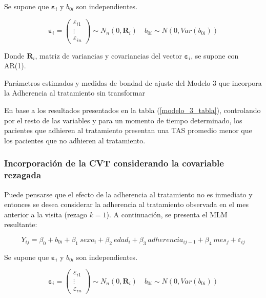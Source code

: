 \documentclass[spanish]{article}
\numberwithin{figure}{subsection}
\numberwithin{equation}{subsection}
\numberwithin{table}{subsection}
\begin{document}
Se supone que $\bm{\varepsilon}_i$ y $b_{0i}$ son independientes.

\[ 
	\bm{\varepsilon}_i = \begin{pmatrix} \varepsilon_{i1} \\ \vdots \\ \varepsilon_{in} \end{pmatrix} \sim N_{n}(0, \bm{R}_i)
	\quad
	b_{0i} \sim N(0, Var(b_{0i}))
\]

Donde $\bm{R}_i$, matriz de variancias y covariancias del vector
$\bm{\varepsilon}_{i}$, se supone con AR(1).

\begin{table}[H]
	\centering
	\caption{Parámetros estimados y medidas de bondad de ajuste del Modelo 3 que incorpora la Adherencia al tratamiento sin transformar}
	\label{modelo_3_tabla}
	
\end{table}

En base a los resultados presentados en la tabla (\ref{modelo_3_tabla}),
controlando por el resto de las variables y para un momento de tiempo
determinado, los pacientes que adhieren al tratamiento presentan una TAS
promedio menor que los pacientes que no adhieren al tratamiento.

\subsubsection{Incorporación de la CVT considerando la covariable rezagada}

Puede pensarse que el efecto de la adherencia al tratamiento no es inmediato y
entonces se desea considerar la adherencia al tratamiento observada en el mes
anterior a la visita (rezago $k=1$). A continuación, se presenta el MLM
resultante:

\begin{equation}
	\label{modelo_4}
	Y_{ij} = \beta_0 + b_{0i} + \beta_1\ sexo_i + \beta_2\ edad_i + \beta_3\ adherencia_{ij-1}
	+ \beta_4\ mes_j + \varepsilon_{ij}
\end{equation}

Se supone que $\bm{\varepsilon}_i$ y $b_{0i}$ son independientes.

\[ 
	\bm{\varepsilon}_i = \begin{pmatrix} \varepsilon_{i1} \\ \vdots \\ \varepsilon_{in} \end{pmatrix} \sim N_{n}(0, \bm{R}_i)
	\quad
	b_{0i} \sim N(0, Var(b_{0i}))
\]
\end{document}
